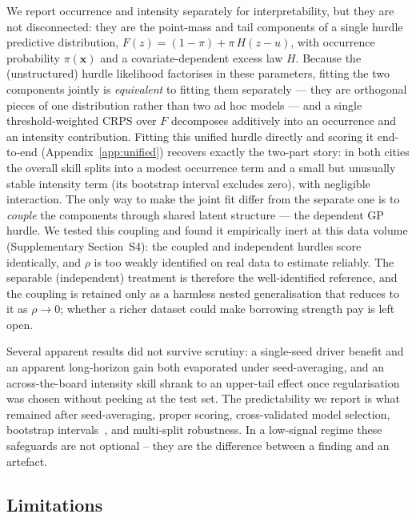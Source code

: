 \documentclass[11pt,a4paper]{article}
\begin{document}
We report occurrence
and intensity separately for interpretability, but they are not disconnected: they
are the point-mass and tail components of a single hurdle predictive distribution,
$F(z)=(1-\pi)+\pi\,H(z-u)$, with occurrence probability $\pi(\mathbf{x})$ and a
covariate-dependent excess law $H$. Because the (unstructured) hurdle likelihood
factorises in these parameters, fitting the two components jointly is \emph{equivalent}
to fitting them separately --- they are orthogonal pieces of one distribution rather
than two ad hoc models --- and a single threshold-weighted CRPS over $F$ decomposes
additively into an occurrence and an intensity contribution. Fitting this unified
hurdle directly and scoring it end-to-end (Appendix~\ref{app:unified}) recovers
exactly the two-part story: in both cities the overall skill splits into a modest
occurrence term and a small but unusually stable intensity term (its bootstrap
interval excludes zero), with negligible interaction. The only way
to make the joint fit differ from the separate one is to \emph{couple} the
components through shared latent structure --- the dependent GP hurdle. We tested
this coupling and found it empirically inert at this data volume (Supplementary
Section~S4): the coupled and independent hurdles score identically, and $\rho$ is
too weakly identified on real data to estimate reliably. The separable
(independent) treatment is therefore the well-identified reference, and the
coupling is retained only as a harmless nested generalisation that reduces to it
as $\rho\to0$; whether a richer dataset could make borrowing strength pay is left
open.

Several apparent results did not survive
scrutiny: a single-seed driver benefit and an apparent long-horizon gain both
evaporated under seed-averaging, and an across-the-board intensity skill shrank to
an upper-tail effect once regularisation was chosen without peeking at the test
set. The predictability we report is what remained after seed-averaging, proper
scoring, cross-validated model selection, bootstrap intervals~\citep{kunsch1989block}, and multi-split
robustness. In a low-signal regime these safeguards are not optional -- they are
the difference between a finding and an artefact.

\subsection{Limitations}
\end{document}
